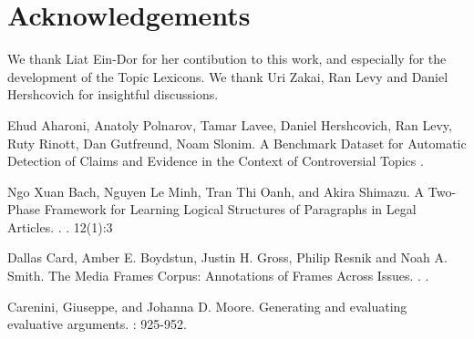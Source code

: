 \documentclass[11pt]{article}
\begin{document}
\section{Acknowledgements}
We thank Liat Ein-Dor for her contibution to this work, and especially for the development of the Topic Lexicons. We thank Uri Zakai, Ran Levy and Daniel Hershcovich for insightful discussions. 

\begin{thebibliography}{}

Ehud Aharoni, Anatoly Polnarov, Tamar Lavee, Daniel Hershcovich, Ran Levy, Ruty Rinott, Dan Gutfreund, Noam Slonim. A Benchmark Dataset for Automatic Detection of Claims and Evidence in the Context of Controversial Topics
.


Ngo Xuan Bach, Nguyen Le Minh, Tran Thi Oanh, and Akira Shimazu. A Two-Phase Framework for Learning Logical Structures of Paragraphs in Legal Articles.
.
. 12(1):3

Dallas Card, Amber E. Boydstun, Justin H. Gross, Philip Resnik and Noah A. Smith. The Media Frames Corpus: Annotations of Frames Across Issues.
.
.


Carenini, Giuseppe, and Johanna D. Moore. Generating and evaluating evaluative arguments. 
\newblock
{}: 925-952.



\end{thebibliography}
\end{document}
